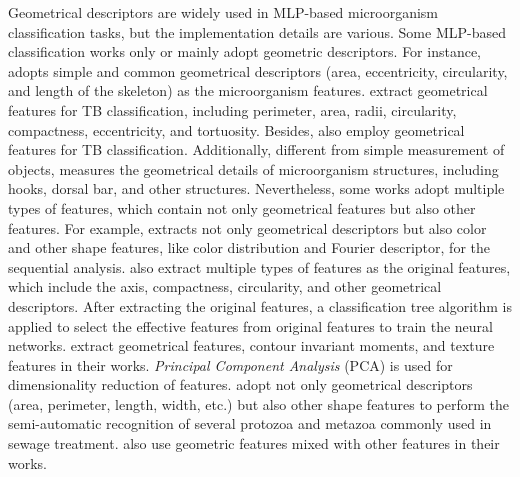 Geometrical descriptors are widely used in MLP-based microorganism classification tasks, but the implementation details are various. Some MLP-based classification works only or mainly adopt geometric descriptors. For instance, \cite{Gerlach-1998-IRSM} adopts simple and common geometrical descriptors (area, eccentricity, circularity, and length of the skeleton) as the microorganism features. \cite{Rulaningtyas-2011-ACTB} extract geometrical features for TB classification, including perimeter, area, radii, circularity, compactness, eccentricity, and tortuosity. Besides, \cite{Osman-2012-OSEL,Siena-2012-DATB} also employ geometrical features for TB classification. Additionally, different from simple measurement of objects, \cite{Kay-1999-TAAS} measures the geometrical details of microorganism structures, including hooks, dorsal bar, and other structures. Nevertheless, some works adopt multiple types of features, which contain not only geometrical features but also other features. For example, \cite{Embleton-2003-ACPP} extracts not only geometrical descriptors but also color and other shape features, like color distribution and Fourier descriptor, for the sequential analysis. \cite{Weller-2005-SCSO,Weller-2007-TSNN} also extract multiple types of features as the original features, which include the axis, compactness, circularity, and other geometrical descriptors. After extracting the original features, a classification tree algorithm is applied to select the effective features from original features to train the neural networks. \cite{Xiaojuan-2007-ANBC,Xiaojuan-2007-ANBR} extract geometrical features, contour invariant moments, and texture features in their works. \emph{Principal Component Analysis} (PCA) is used for dimensionality reduction of features. \cite{Ginoris-2006-RPMU,Ginoris-2007-RPMU} adopt not only geometrical descriptors (area, perimeter, length, width, etc.) but also other shape features to perform the semi-automatic recognition of several protozoa and metazoa commonly used in sewage treatment. \cite{Balfoort-1992-AIAN,Xiaojuan-2008-ANWB,Cunshe-2008-ANWB,Amaral-2008-SPII,Xiaojuan-2009-AIBN,Kiranyaz-2011-CRMI,Mosleh-2012-APSA,Danping-2013-IPMS} also use geometric features mixed with other features in their works.



